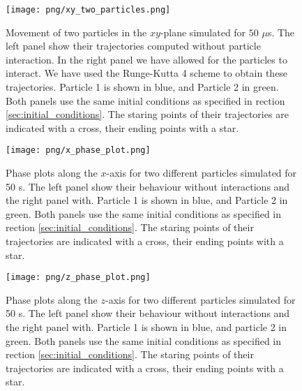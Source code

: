 \begin{figure}
    \texttt{[image: png/xy\_two\_particles.png]}
    \caption{Movement of two particles in the $xy$-plane simulated for $50$ $\mu$s. The left panel show their trajectories computed without particle interaction. In the right panel we have allowed for the particles to interact. We have used the Runge-Kutta 4 scheme to obtain these trajectories. Particle 1 is shown in blue, and Particle 2 in green. Both panels use the same initial conditions as specified in rection \ref{sec:initial_conditions}. The staring points of their trajectories are indicated with a cross, their ending points with a star. }
    \label{fig:xy_two_particles}
\end{figure}

\begin{figure}
    \texttt{[image: png/x\_phase\_plot.png]}
    \caption{Phase plots along the $x$-axis for two different particles simulated for 50 \textmu s. The left panel show their behaviour without interactions and the right panel with. Particle 1 is shown in blue, and Particle 2 in green. Both panels use the same initial conditions as specified in rection \ref{sec:initial_conditions}. The staring points of their trajectories are indicated with a cross, their ending points with a star.}
    \label{fig:x_phase_two_particles}
\end{figure} 

\begin{figure}
    \texttt{[image: png/z\_phase\_plot.png]}
    \caption{Phase plots along the $z$-axis for two different particles simulated for 50 \textmu s. The left panel show their behaviour without interactions and the right panel with. Particle 1 is shown in blue, and particle 2 in green. Both panels use the same initial conditions as specified in rection \ref{sec:initial_conditions}. The staring points of their trajectories are indicated with a cross, their ending points with a star.}
    \label{fig:z_phase_two_particles}
\end{figure}
\twocolumngrid





